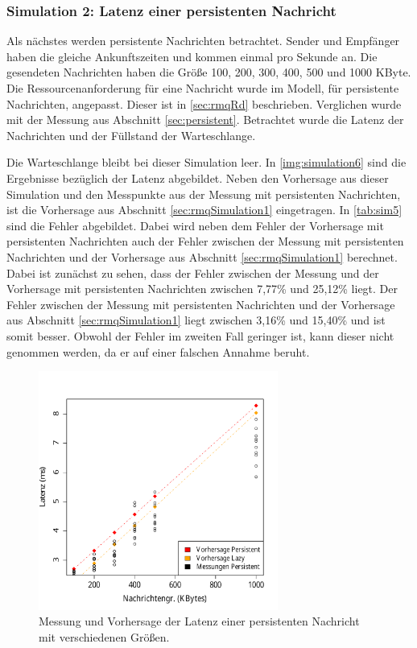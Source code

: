 \subsubsection{Simulation 2: Latenz einer persistenten Nachricht}
\label{sec:rmqSimulationPersistent}
Als nächstes werden persistente Nachrichten betrachtet. Sender und Empfänger haben die gleiche Ankunftszeiten und kommen einmal pro Sekunde an. Die gesendeten Nachrichten haben die Größe 100, 200, 300, 400, 500 und 1000 KByte. Die Ressourcenanforderung für eine Nachricht wurde im Modell, für persistente Nachrichten, angepasst. Dieser ist in \autoref{sec:rmqRd} beschrieben. Verglichen wurde mit der Messung aus Abschnitt \ref{sec:persistent}. Betrachtet wurde die Latenz der Nachrichten und der Füllstand der Warteschlange. \par
Die Warteschlange bleibt bei dieser Simulation leer. In \autoref{img:simulation6} sind die Ergebnisse bezüglich der Latenz abgebildet. Neben den Vorhersage aus dieser Simulation und den Messpunkte aus der Messung mit persistenten Nachrichten, ist die Vorhersage aus Abschnitt \ref{sec:rmqSimulation1} eingetragen. In \autoref{tab:sim5} sind die Fehler abgebildet. Dabei wird neben dem Fehler der Vorhersage mit persistenten Nachrichten auch der Fehler zwischen der Messung mit persistenten Nachrichten und der Vorhersage aus Abschnitt \ref{sec:rmqSimulation1} berechnet. Dabei ist zunächst zu sehen, dass der Fehler zwischen der Messung und der Vorhersage mit persistenten Nachrichten zwischen 7,77\% und 25,12\% liegt. Der Fehler zwischen der Messung mit persistenten Nachrichten und der Vorhersage aus Abschnitt \ref{sec:rmqSimulation1} liegt zwischen 3,16\% und 15,40\% und ist somit besser. Obwohl der Fehler im zweiten Fall geringer ist, kann dieser nicht genommen werden, da er auf einer falschen Annahme beruht.
\begin{figure}
\center
  \includegraphics[width=0.7\textwidth]{images/modelSimulationResults/simulation7.pdf}
  \caption{Messung und Vorhersage der Latenz einer persistenten Nachricht mit verschiedenen Größen.}
  \label{img:simulation6}
\end{figure}

